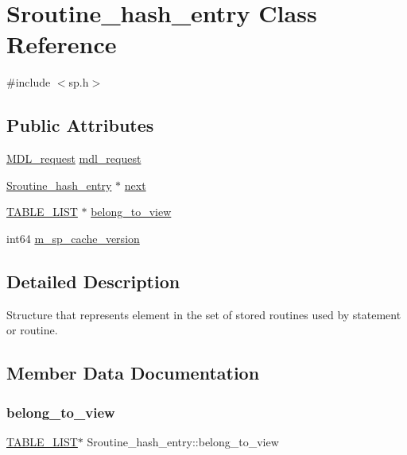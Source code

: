 \hypertarget{classSroutine__hash__entry}{}\section{Sroutine\+\_\+hash\+\_\+entry Class Reference}
\label{classSroutine__hash__entry}


{\ttfamily \#include $<$sp.\+h$>$}

\subsection*{Public Attributes}
\begin{DoxyCompactItemize}
\item 
\mbox{\hyperlink{classMDL__request}{M\+D\+L\+\_\+request}} \mbox{\hyperlink{classSroutine__hash__entry_a5ad1ee11879a690fc6a3c7370cdd336b}{mdl\+\_\+request}}
\item 
\mbox{\hyperlink{classSroutine__hash__entry}{Sroutine\+\_\+hash\+\_\+entry}} $\ast$ \mbox{\hyperlink{classSroutine__hash__entry_a5a3994c4b9f777644d75cbdd994dda92}{next}}
\item 
\mbox{\hyperlink{structTABLE__LIST}{T\+A\+B\+L\+E\+\_\+\+L\+I\+ST}} $\ast$ \mbox{\hyperlink{classSroutine__hash__entry_afb4a584b7fe6061c1b1be339f162f3bd}{belong\+\_\+to\+\_\+view}}
\item 
int64 \mbox{\hyperlink{classSroutine__hash__entry_aeade37d74fafe8a860b1c6e37c45df97}{m\+\_\+sp\+\_\+cache\+\_\+version}}
\end{DoxyCompactItemize}


\subsection{Detailed Description}
Structure that represents element in the set of stored routines used by statement or routine. 

\subsection{Member Data Documentation}
\mbox{\label{classSroutine__hash__entry_afb4a584b7fe6061c1b1be339f162f3bd}} 
\subsubsection{\texorpdfstring{belong\+\_\+to\+\_\+view}{belong\_to\_view}}
{\footnotesize\ttfamily \mbox{\hyperlink{structTABLE__LIST}{T\+A\+B\+L\+E\+\_\+\+L\+I\+ST}}$\ast$ Sroutine\+\_\+hash\+\_\+entry\+::belong\+\_\+to\+\_\+view}

